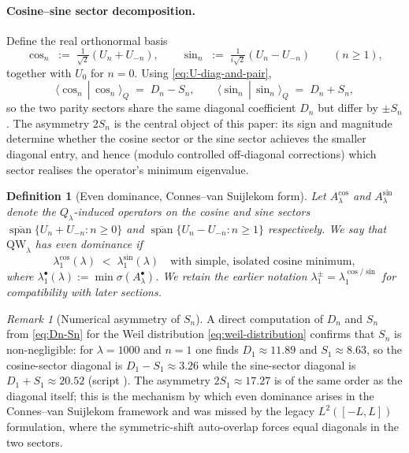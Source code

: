 \documentclass[11pt,a4paper]{article}
\newtheorem{definition}[definition]{Definition}
\theoremstyle{remark}
\newtheorem{remark}[remark]{Remark}
\theoremstyle{plain}
\newcommand{\QW}{\mathrm{QW}}
\begin{document}
\paragraph{Cosine--sine sector decomposition.}  Define the real
orthonormal basis
\[
  \cos_n \;:=\; \tfrac{1}{\sqrt 2}(U_n + U_{-n}),
  \qquad
  \sin_n \;:=\; \tfrac{1}{i\sqrt 2}(U_n - U_{-n})
  \qquad (n\geq 1),
\]
together with $U_0$ for $n=0$.  Using \eqref{eq:U-diag-and-pair},
\begin{equation}
\label{eq:cos-sin-diagonals}
  \langle \cos_n\,|\,\cos_n\rangle_Q \;=\; D_n - S_n,
  \qquad
  \langle \sin_n\,|\,\sin_n\rangle_Q \;=\; D_n + S_n,
\end{equation}
so the two parity sectors share the same diagonal coefficient $D_n$
but differ by $\pm S_n$.  The asymmetry $2S_n$ is the central object
of this paper: its sign and magnitude determine whether the cosine
sector or the sine sector achieves the smaller diagonal entry, and
hence (modulo controlled off-diagonal corrections) which sector
realises the operator's minimum eigenvalue.

\begin{definition}[Even dominance, Connes--van Suijlekom form]
\label{def:even-dominance}
Let $A_\lambda^{\cos}$ and $A_\lambda^{\sin}$ denote the
$Q_\lambda$-induced operators on the cosine and sine sectors
$\overline{\operatorname{span}}\{U_n+U_{-n}:n\geq 0\}$ and
$\overline{\operatorname{span}}\{U_n-U_{-n}:n\geq 1\}$ respectively.
We say that $\QW_\lambda$ has \emph{even dominance} if
\[
  \lambda_1^{\cos}(\lambda) \;<\; \lambda_1^{\sin}(\lambda)
  \quad\text{with simple, isolated cosine minimum},
\]
where $\lambda_1^{\bullet}(\lambda):=\min\sigma(A_\lambda^{\bullet})$.
We retain the earlier notation $\lambda_1^\pm=\lambda_1^{\cos/\sin}$
for compatibility with later sections.
\end{definition}

\begin{remark}[Numerical asymmetry of $S_n$]
\label{rem:Sn-numerics}
A direct computation of $D_n$ and $S_n$ from
\eqref{eq:Dn-Sn} for the Weil distribution
\eqref{eq:weil-distribution} confirms that $S_n$ is non-negligible:
for $\lambda=1000$ and $n=1$ one finds $D_1\approx 11.89$ and
$S_1\approx 8.63$, so the cosine-sector diagonal is $D_1-S_1\approx 3.26$
while the sine-sector diagonal is $D_1+S_1\approx 20.52$
(script ).  The
asymmetry $2S_1\approx 17.27$ is of the same order as the diagonal
itself; this is the mechanism by which even dominance arises in the
Connes--van Suijlekom framework and was missed by the legacy
$L^2([-L,L])$ formulation, where the symmetric-shift auto-overlap
forces equal diagonals in the two sectors.
\end{remark}
\end{document}
